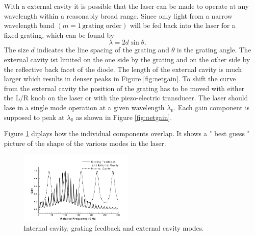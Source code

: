 With a external cavity it is possible that the laser can be made to operate at any wavelength within a reasonably broad range.
Since only light from a narrow wavelength band $\left(m = 1  \,\text{grating order}\right)$ will be fed back into the laser for a fixed grating,
which can be found by 
\begin{equation}
    \lambda = 2 d \sin \theta.
\end{equation}
The size $d$ indicates the line spacing of the grating and $\theta$ is the grating angle. The external cavity ist limited on the one side by the grating and on the
other side by the reflective back facet of the diode. The length of the external cavity is much larger which results in denser peaks in Figure \ref{fig:netgain}.
To shift the curve from the external cavity the position of the grating has to be moved with either the L/R knob on the laser or with the piezo-electric transducer.
The laser should lase in a single mode operation at a given wavelength $\lambda_0$. Each gain component is supposed to peak at $\lambda_0$ as shown in Figure \ref{fig:netgain}.

Figure \ref{fig:best} diplays how the individual components overlap. It shows a " best guess " picture of the shape of the various modes in the laser.
\begin{figure}[H]
    \centering
    \includegraphics[width=0.5\textwidth]{content/graphics/best-guess.jpg}
    \caption{Internal cavity, grating feedback and external cavity modes. \cite{diode_laser}}
    \label{fig:best} 
\end{figure}

